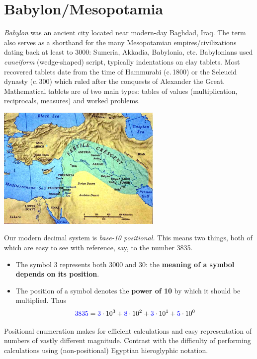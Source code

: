 \graphicspath{{2babylon/pics/}}

\section{Babylon/Mesopotamia}

\begin{minipage}[t]{0.53\linewidth}\vspace{0pt}
	\emph{Babylon} was an ancient city located near modern-day Baghdad, Iraq. The term also serves as a shorthand for the many Mesopotamian\footnotemark{} empires/civilizations dating back at least to 3000\BC{}: Sumeria, Akkadia, Babylonia, etc.
	\smallbreak
	Babylonians used \emph{cuneiform} (wedge-shaped) script, typically indentations on clay tablets. Most recovered tablets date from the time of Hammurabi (c.\,1800\BC) or the Seleucid dynasty (c.\,300\BC) which ruled after the conquests of Alexander the Great.
	\smallbreak
	Mathematical tablets are of two main types: tables of values (multiplication, reciprocals, measures) and worked problems.
\end{minipage}
\hfill
\begin{minipage}[t]{0.46\linewidth}\vspace{0pt}
	\flushright
	\includegraphics[scale=0.7]{sumermap}
\end{minipage}




Our modern decimal system is \emph{base-10 positional.} This means two things, both of which are easy to see with reference, say, to the number 3835.
\begin{itemize}
	\item The symbol 3 represents both 3000 and 30: the \textbf{meaning of a symbol depends on its position}.
	\item The position of a symbol denotes the \textbf{power of 10} by which it should be multiplied. Thus
	\[
		\textcolor{blue}{3835} =\textcolor{blue}{3}\cdot 10^3 +\textcolor{blue}{8}\cdot 10^2 +\textcolor{blue}{3}\cdot 10^1 +\textcolor{blue}{5}\cdot 10^0
	\]
\end{itemize}
Positional enumeration makes for efficient calculations and easy representation of numbers of vastly different magnitude. Contrast with the difficulty of performing calculations using (non-positional) Egyptian hieroglyphic notation.\smallbreak

